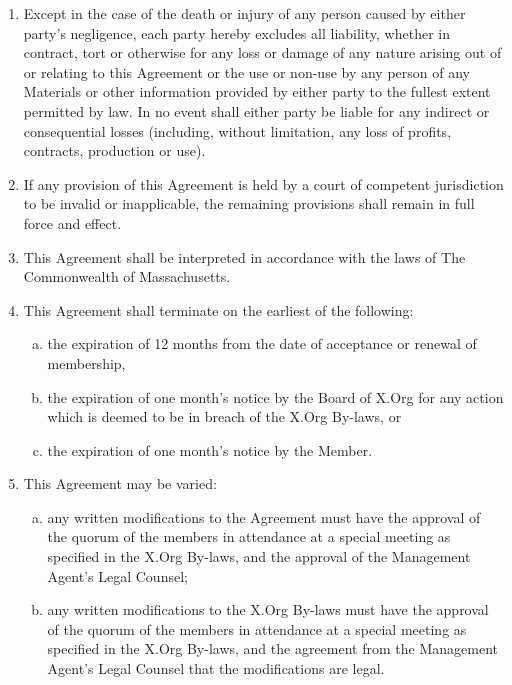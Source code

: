 \documentclass[10pt, english]{xorgdocs}
\begin{document}
\begin{enumerate}[(1)\hspace{.2cm}]
	\item Except in the case of the death or injury of any person caused
	by either party's negligence, each party hereby excludes all liability,
	whether in contract, tort or otherwise for any loss or damage of any
	nature arising out of or relating to this Agreement or the use or
	non-use by any person of any Materials or other information provided
	by either party to the fullest extent permitted by law. In no event
	shall either party be liable for any indirect or consequential losses
	(including, without limitation, any loss of profits, contracts,
	production or use).

	\item If any provision of this Agreement is held by a court of
	competent jurisdiction to be invalid or inapplicable, the remaining
	provisions shall remain in full force and effect.

	\item This Agreement shall be interpreted in accordance with the laws
	of The Commonwealth of Massachusetts.

	\item This Agreement shall terminate on the earliest of the following:

	\begin{enumerate}[(a)\hspace{.2cm}]
		\item the expiration of 12 months from the date of acceptance
		or renewal of membership,
		\item the expiration of one month’s notice by the Board of
		X.Org for any action which is deemed to be in breach of the
		X.Org By-laws, or
		\item the expiration of one month's notice by the Member.
	\end{enumerate}

	\item This Agreement may be varied:

	\begin{enumerate}[(a)\hspace{.2cm}]
		\item any written modifications to the Agreement must have
		the approval of the quorum of the members in attendance at
		a special meeting as specified in the X.Org By-laws, and
		the approval of the Management Agent’s Legal Counsel;
		\item any written modifications to the X.Org By-laws must
		have the approval of the quorum of the members in attendance
		at a special meeting as specified in the X.Org By-laws, and
		the agreement from the Management Agent’s Legal Counsel that
		the modifications are legal.
	\end{enumerate}

\end{enumerate}
\end{document}
